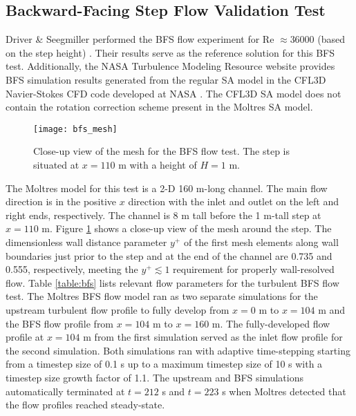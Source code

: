 \FloatBarrier

\subsection{Backward-Facing Step Flow Validation Test}

Driver \& Seegmiller performed the \gls{BFS} flow experiment for Re $\approx36000$ (based on the
step height)
\cite{driver_features_1985}. Their results serve as the reference solution for this \gls{BFS} test.
Additionally, the \gls{NASA} Turbulence Modeling Resource website \cite{rumsey_turbulence_nodate}
provides \gls{BFS} simulation results generated from the regular \gls{SA} model in the CFL3D
Navier-Stokes CFD code developed at \gls{NASA} \cite{krist_cfl3d_1998}. The CFL3D \gls{SA} model
does not contain the rotation correction scheme
\cite{aupoix_extensions_2003, dacles-mariani_numericalexperimental_1995} present in the Moltres
\gls{SA} model.

\begin{figure}[htb!]
  \centering
  \texttt{[image: bfs\_mesh]}
  \caption{Close-up view of the mesh for the \gls{BFS} flow test. The step is situated at $x=110$ m
  with a height of $H=1$ m.}
  \label{fig:bfs-mesh}
\end{figure}

The Moltres model for this test is a 2-D 160 m-long channel. The main flow direction is in the
positive $x$ direction with the inlet and outlet on the left and right ends, respectively. The
channel is 8 m tall before the 1 m-tall step at $x=110$ m. Figure \ref{fig:bfs-mesh} shows a
close-up view of the mesh around the step. The dimensionless wall distance parameter $y^+$ of the
first mesh elements along wall boundaries just prior to the step and at the end of the channel are
0.735 and 0.555, respectively, meeting the $y^+ \lesssim 1$ requirement for properly wall-resolved
flow. Table \ref{table:bfs} lists relevant flow parameters for the turbulent \gls{BFS} flow test.
The Moltres \gls{BFS} flow model ran as two separate simulations for the upstream turbulent flow
profile to fully develop from $x=0$ m to $x=104$ m and the \gls{BFS} flow profile from $x=104$ m to
$x=160$ m. The fully-developed flow profile at $x=104$ m from the first simulation served as the
inlet flow profile for the second simulation. Both simulations ran with adaptive time-stepping
starting from a timestep size of 0.1 s up to a maximum timestep size of 10 s with a timestep size
growth factor of 1.1. The upstream and \gls{BFS} simulations automatically terminated at $t=212$ s
and $t=223$ s when Moltres detected that the flow profiles reached steady-state.

